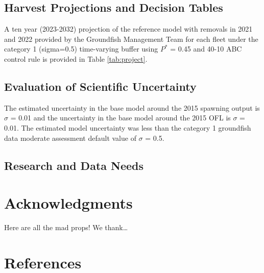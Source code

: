 \documentclass[11pt,
  english,
  letterpaper,
]{article}
\begin{document}
\hypertarget{harvest-projections-and-decision-tables}{%
\subsection{Harvest Projections and Decision Tables}\label{harvest-projections-and-decision-tables}}

A ten year (2023-2032) projection of the reference model with removals in 2021 and 2022 provided by the Groundfish Management Team for each fleet under the category 1 (sigma=0.5) time-varying buffer using \(P^*\) = 0.45 and 40-10 ABC control rule is provided in Table \ref{tab:project}.

\hypertarget{evaluation-of-scientific-uncertainty}{%
\subsection{Evaluation of Scientific Uncertainty}\label{evaluation-of-scientific-uncertainty}}

The estimated uncertainty in the base model around the 2015 spawning output is \(\sigma\) = 0.01 and the uncertainty in the base model around the 2015 OFL is \(\sigma\) = 0.01. The estimated model uncertainty was less than the category 1 groundfish data moderate assessment default value of \(\sigma\) = 0.5.

\hypertarget{research-and-data-needs-1}{%
\subsection{Research and Data Needs}\label{research-and-data-needs-1}}

\hypertarget{acknowledgments}{%
\section{Acknowledgments}\label{acknowledgments}}

Here are all the mad props! We thank\ldots{}

\clearpage

\hypertarget{references}{%
\section{References}\label{references}}
\end{document}
